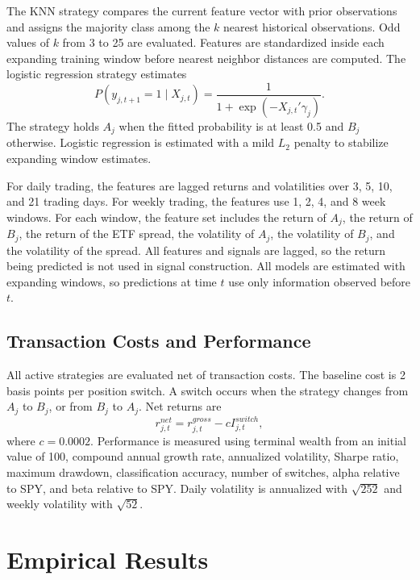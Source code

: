 \documentclass[investment,article,submit,pdftex,moreauthors]{Definitions/mdpi}
\begin{document}
The KNN strategy compares the current feature vector with prior observations and assigns the majority class among the \(k\) nearest historical observations. Odd values of \(k\) from 3 to 25 are evaluated. Features are standardized inside each expanding training window before nearest neighbor distances are computed. The logistic regression strategy estimates
\begin{equation}
P(y_{j,t+1}=1 \mid X_{j,t})=
\frac{1}{1+\exp(-X_{j,t}'\gamma_j)}.
\end{equation}
The strategy holds \(A_j\) when the fitted probability is at least 0.5 and \(B_j\) otherwise. Logistic regression is estimated with a mild \(L_2\) penalty to stabilize expanding window estimates.

For daily trading, the features are lagged returns and volatilities over 3, 5, 10, and 21 trading days. For weekly trading, the features use 1, 2, 4, and 8 week windows. For each window, the feature set includes the return of \(A_j\), the return of \(B_j\), the return of the ETF spread, the volatility of \(A_j\), the volatility of \(B_j\), and the volatility of the spread. All features and signals are lagged, so the return being predicted is not used in signal construction. All models are estimated with expanding windows, so predictions at time \(t\) use only information observed before \(t\).

\subsection{Transaction Costs and Performance}

All active strategies are evaluated net of transaction costs. The baseline cost is 2 basis points per position switch. A switch occurs when the strategy changes from \(A_j\) to \(B_j\), or from \(B_j\) to \(A_j\). Net returns are
\begin{equation}
r^{net}_{j,t}=r^{gross}_{j,t}-cI^{switch}_{j,t},
\end{equation}
where \(c=0.0002\). Performance is measured using terminal wealth from an initial value of 100, compound annual growth rate, annualized volatility, Sharpe ratio, maximum drawdown, classification accuracy, number of switches, alpha relative to SPY, and beta relative to SPY. Daily volatility is annualized with \(\sqrt{252}\) and weekly volatility with \(\sqrt{52}\).

\section{Empirical Results}
\end{document}
